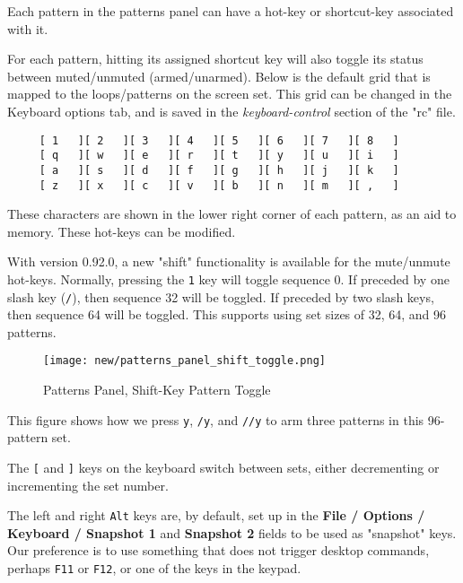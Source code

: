    Each pattern in the patterns panel can have a hot-key or shortcut-key
   associated with it.

   For each pattern, hitting its assigned shortcut key will
   also toggle its status between muted/unmuted (armed/unarmed).
   Below is the default grid that is
   mapped to the loops/patterns on the screen set.
   This grid can be changed in the Keyboard options tab, and is
   saved in the \textsl{keyboard-control} section of the
   "rc" file.

   \begin{verbatim}
     [ 1   ][ 2   ][ 3   ][ 4   ][ 5   ][ 6   ][ 7   ][ 8   ]
     [ q   ][ w   ][ e   ][ r   ][ t   ][ y   ][ u   ][ i   ]
     [ a   ][ s   ][ d   ][ f   ][ g   ][ h   ][ j   ][ k   ]
     [ z   ][ x   ][ c   ][ v   ][ b   ][ n   ][ m   ][ ,   ]
   \end{verbatim}

   These characters are shown in the lower right corner of each
   pattern, as an aid to memory.
   These hot-keys can be modified.

   With version 0.92.0, a new "shift" functionality is available for the
   mute/unmute hot-keys.
   Normally, pressing the \texttt{1} key will toggle
   sequence 0.  If preceded by one slash key (\texttt{/}), then sequence 32
   will be toggled.  If preceded by two slash keys, then sequence 64 will be
   toggled.  This supports using set sizes of 32, 64, and 96 patterns.

\begin{figure}[H]
   \centering 
   \texttt{[image: new/patterns\_panel\_shift\_toggle.png]}
   \caption{Patterns Panel, Shift-Key Pattern Toggle}
   \label{fig:pattern_window_shift_key_pattern_toggle}
\end{figure}

   This figure shows how we press \texttt{y}, \texttt{/y}, and \texttt{//y}
   to arm three patterns in this 96-pattern set.

   \index{keys![}
   The \texttt{[} and
   \index{keys!]}
   \texttt{]} keys on the keyboard
   switch between sets, either decrementing or incrementing the set number.

   The left and right \texttt{Alt} keys are, by default, set up in the
   \textbf{File / Options / Keyboard / Snapshot 1} and
   \textbf{Snapshot 2} fields to be used as "snapshot" keys.
   Our preference is to use something that does not trigger desktop
   commands, perhaps \texttt{F11} or \texttt{F12}, or one of the keys in the
   keypad.


